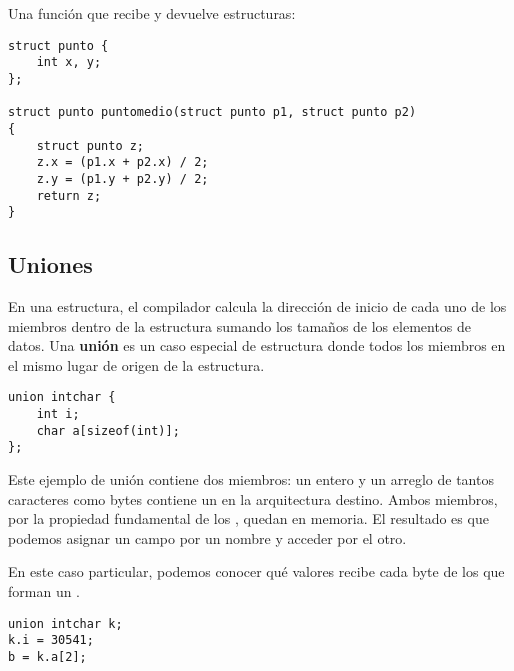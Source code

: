 \begin{ejemplo}
Una función que recibe y devuelve estructuras:
\begin{lstlisting}
struct punto {
    int x, y;
};

struct punto puntomedio(struct punto p1, struct punto p2)
{
    struct punto z;
    z.x = (p1.x + p2.x) / 2;
    z.y = (p1.y + p2.y) / 2;
    return z;
}
\end{lstlisting}
\end{ejemplo}

\subsection{Uniones}
En una estructura, el compilador calcula la dirección de inicio de cada uno de
los miembros dentro de la estructura sumando los tamaños de los elementos de
datos. Una \textbf{unión} es un caso especial de estructura donde todos los miembros
 en el mismo lugar de origen de la estructura.
\begin{lstlisting}
union intchar {
    int i;
    char a[sizeof(int)];
};
\end{lstlisting}
Este ejemplo de unión contiene dos miembros: un entero y un arreglo de tantos
caracteres como bytes contiene un  en la arquitectura destino. Ambos
miembros, por la propiedad fundamental de los , quedan  en
memoria. El resultado es que podemos asignar un campo por un nombre y acceder
por el otro. 

\begin{ejemplo}
En este caso particular, podemos conocer qué valores recibe cada
byte de los que forman un .
\begin{lstlisting}
union intchar k;
k.i = 30541;
b = k.a[2];
\end{lstlisting}
\end{ejemplo}

